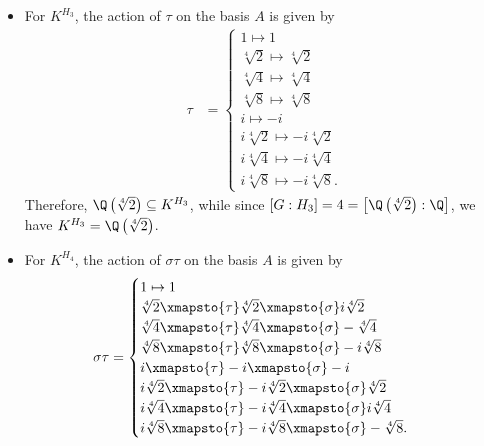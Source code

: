 \documentclass[10pt]{mypackage}
\begin{document}
\begin{solution}
\begin{enumerate}[(a)]
\begin{itemize}
\begin{align*}
\begin{cases}
            \end{cases}
          \end{align*}
          Therefore, we have $\Q\left( i,\sqrt{2} \right)\subseteq K^{H_2}$. Since $\left[ G:H_2 \right] = 4 = \left[ \Q\left( i,\sqrt{2} \right):\Q \right]$, equivalence follows.
        \item For $K^{H_3}$, the action of $\tau$ on the basis $A$ is given by
          \begin{align*}
            \tau &= \begin{cases}
              1\mapsto 1\\
              \sqrt[4]{2} \mapsto \sqrt[4]{2}\\
              \sqrt[4]{4} \mapsto \sqrt[4]{4}\\
              \sqrt[4]{8} \mapsto \sqrt[4]{8}\\
              i\mapsto -i\\
              i\sqrt[4]{2} \mapsto -i\sqrt[4]{2}\\
              i\sqrt[4]{4} \mapsto -i\sqrt[4]{4}\\
              i\sqrt[4]{8}\mapsto -i\sqrt[4]{8}.
            \end{cases}
          \end{align*}
          Therefore, $\Q\left( \sqrt[4]{2} \right)\subseteq K^{H_3}$, while since $\left[ G:H_3 \right]=4=\left[ \Q\left( \sqrt[4]{2} \right):\Q \right]$, we have $K^{H_3} = \Q\left( \sqrt[4]{2} \right)$.
        \item For $K^{H_4}$, the action of $\sigma\tau$ on the basis $A$ is given by
          \begin{align*}
            \sigma\tau &= \begin{cases}
              1\mapsto 1\\
              \sqrt[4]{2}\xmapsto{\tau}\sqrt[4]{2}\xmapsto{\sigma}i\sqrt[4]{2}\\
              \sqrt[4]{4}\xmapsto{\tau}\sqrt[4]{4}\xmapsto{\sigma}-\sqrt[4]{4}\\
              \sqrt[4]{8}\xmapsto{\tau}\sqrt[4]{8}\xmapsto{\sigma}-i\sqrt[4]{8}\\
              i\xmapsto{\tau}-i\xmapsto{\sigma}-i\\
              i\sqrt[4]{2}\xmapsto{\tau}-i\sqrt[4]{2}\xmapsto{\sigma}\sqrt[4]{2}\\
              i\sqrt[4]{4}\xmapsto{\tau}-i\sqrt[4]{4}\xmapsto{\sigma} i\sqrt[4]{4}\\
              i\sqrt[4]{8}\xmapsto{\tau}-i\sqrt[4]{8}\xmapsto{\sigma} -\sqrt[4]{8}.

\end{cases}
\end{align*}
\end{itemize}
\end{enumerate}
\end{solution}
\end{document}
